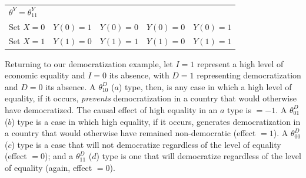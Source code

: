 \documentclass[12pt,]{book}
\begin{document}
\begin{longtable}[]{@{}lcccc@{}}
\begin{minipage}[t]{0.18\columnwidth}
\(\theta^Y=\theta^Y_{11}\)\strut
\end{minipage}\tabularnewline
\begin{minipage}[t]{0.10\columnwidth}\raggedright
Set \(X=0\)\strut
\end{minipage} & \begin{minipage}[t]{0.19\columnwidth}\centering
\(Y(0)=1\)\strut
\end{minipage} & \begin{minipage}[t]{0.21\columnwidth}\centering
\(Y(0)=0\)\strut
\end{minipage} & \begin{minipage}[t]{0.18\columnwidth}\centering
\(Y(0)=0\)\strut
\end{minipage} & \begin{minipage}[t]{0.18\columnwidth}\centering
\(Y(0)=1\)\strut
\end{minipage}\tabularnewline
\begin{minipage}[t]{0.10\columnwidth}\raggedright
Set \(X=1\)\strut
\end{minipage} & \begin{minipage}[t]{0.19\columnwidth}\centering
\(Y(1)=0\)\strut
\end{minipage} & \begin{minipage}[t]{0.21\columnwidth}\centering
\(Y(1)=1\)\strut
\end{minipage} & \begin{minipage}[t]{0.18\columnwidth}\centering
\(Y(1)=0\)\strut
\end{minipage} & \begin{minipage}[t]{0.18\columnwidth}\centering
\(Y(1)=1\)\strut
\end{minipage}\tabularnewline
\bottomrule
\end{longtable}

Returning to our democratization example, let \(I=1\) represent a high level of economic equality and \(I=0\) its absence, with \(D=1\) representing democratization and \(D=0\) its absence. A \(\theta^D_{10}\) (\(a\)) type, then, is any case in which a high level of equality, if it occurs, \emph{prevents} democratization in a country that would otherwise have democratized. The causal effect of high equality in an \(a\) type is \(= -1\). A \(\theta^D_{01}\) (\(b\)) type is a case in which high equality, if it occurs, generates democratization in a country that would otherwise have remained non-democratic (effect \(= 1\)). A \(\theta^D_{00}\) (\(c\)) type is a case that will not democratize regardless of the level of equality (effect \(= 0\)); and a \(\theta^D_{11}\) (\(d\)) type is one that will democratize regardless of the level of equality (again, effect \(= 0\)).
\end{document}
